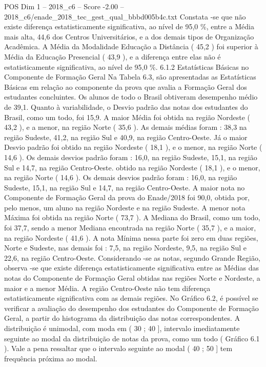 \begin{textsample}{POS Dim 1 – 2018\_c6 – Score -2.00 – 2018\_c6/enade\_2018\_tec\_gest\_qual\_bbbd005b4c.txt}
Constata -se que não existe diferença estatisticamente significativa, ao nível de 95,0 \%, entre a Média mais alta, 44,6 dos Centros Universitários, e a dos demais tipos de Organização Acadêmica.
A Média da Modalidade Educação a Distância ( 45,2 ) foi superior à Média da Educação Presencial ( 43,9 ), e a diferença entre elas não é estatisticamente significativa, ao nível de 95,0 \%. 6.1.2 Estatísticas Básicas no Componente de Formação Geral Na Tabela 6.3, são apresentadas as Estatísticas Básicas em relação ao componente da prova que avalia a Formação Geral dos estudantes concluintes.
Os alunos de todo o Brasil obtiveram desempenho médio de 39,1.
Quanto à variabilidade, o Desvio padrão das notas dos estudantes do Brasil, como um todo, foi 15,9.
A maior Média foi obtida na região Nordeste ( 43,2 ), e a menor, na região Norte ( 35,6 ).
As demais médias foram : 38,3 na região Sudeste, 41,2, na região Sul e 40,9, na região Centro-Oeste.
Já o maior Desvio padrão foi obtido na região Nordeste ( 18,1 ), e o menor, na região Norte ( 14,6 ).
Os demais desvios padrão foram : 16,0, na região Sudeste, 15,1, na região Sul e 14,7, na região Centro-Oeste. obtido na região Nordeste ( 18,1 ), e o menor, na região Norte ( 14,6 ).
Os demais desvios padrão foram : 16,0, na região Sudeste, 15,1, na região Sul e 14,7, na região Centro-Oeste.
A maior nota no Componente de Formação Geral da prova do Enade/2018 foi 90,0, obtida por, pelo menos, um aluno na região Nordeste e na região Sudeste.
A menor nota Máxima foi obtida na região Norte ( 73,7 ).
A Mediana do Brasil, como um todo, foi 37,7, sendo a menor Mediana encontrada na região Norte ( 35,7 ), e a maior, na região Nordeste ( 41,6 ).
A nota Mínima nessa parte foi zero em duas regiões, Norte e Sudeste, nas demais foi : 7,5, na região Nordeste, 9,5, na região Sul e 22,6, na região Centro-Oeste.
Considerando -se as notas, segundo Grande Região, observa -se que existe diferença estatisticamente significativa entre as Médias das notas do Componente de Formação Geral obtidas nas regiões Norte e Nordeste, a maior e a menor Média.
A região Centro-Oeste não tem diferença estatisticamente significativa com as demais regiões.
No Gráfico 6.2, é possível se verificar a avaliação do desempenho dos estudantes do Componente de Formação Geral, a partir do histograma da distribuição das notas correspondentes.
A distribuição é unimodal, com moda em ( 30 ; 40 ], intervalo imediatamente seguinte ao modal da distribuição de notas da prova, como um todo ( Gráfico 6.1 ).
Vale a pena ressaltar que o intervalo seguinte ao modal ( 40 ; 50 ] tem frequência próxima ao modal.

\end{textsample}
